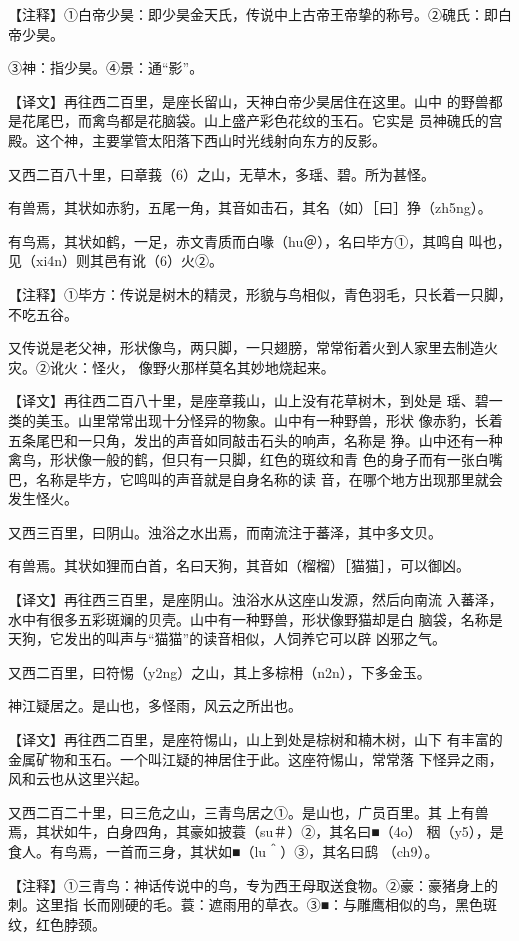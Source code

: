 \documentclass[a4paper,12pt,UTF8,twoside]{ctexbook}
\begin{document}
【注释】①白帝少昊：即少昊金天氏，传说中上古帝王帝挚的称号。②磈氏：即白帝少昊。

③神：指少昊。④景：通“影”。

【译文】再往西二百里，是座长留山，天神白帝少昊居住在这里。山中 的野兽都是花尾巴，而禽鸟都是花脑袋。山上盛产彩色花纹的玉石。它实是 员神磈氏的宫殿。这个神，主要掌管太阳落下西山时光线射向东方的反影。

又西二百八十里，曰章莪（6）之山，无草木，多瑶、碧。所为甚怪。

有兽焉，其状如赤豹，五尾一角，其音如击石，其名（如）［曰］狰（zh5ng）。

有鸟焉，其状如鹤，一足，赤文青质而白喙（hu＠），名曰毕方①，其鸣自 叫也，见（xi4n）则其邑有讹（6）火②。

【注释】①毕方：传说是树木的精灵，形貌与鸟相似，青色羽毛，只长着一只脚，不吃五谷。

又传说是老父神，形状像鸟，两只脚，一只翅膀，常常衔着火到人家里去制造火灾。②讹火：怪火， 像野火那样莫名其妙地烧起来。

【译文】再往西二百八十里，是座章莪山，山上没有花草树木，到处是 瑶、碧一类的美玉。山里常常出现十分怪异的物象。山中有一种野兽，形状 像赤豹，长着五条尾巴和一只角，发出的声音如同敲击石头的响声，名称是 狰。山中还有一种禽鸟，形状像一般的鹤，但只有一只脚，红色的斑纹和青 色的身子而有一张白嘴巴，名称是毕方，它鸣叫的声音就是自身名称的读 音，在哪个地方出现那里就会发生怪火。

又西三百里，曰阴山。浊浴之水出焉，而南流注于蕃泽，其中多文贝。

有兽焉。其状如狸而白首，名曰天狗，其音如（榴榴）［猫猫］，可以御凶。

【译文】再往西三百里，是座阴山。浊浴水从这座山发源，然后向南流 入蕃泽，水中有很多五彩斑斓的贝壳。山中有一种野兽，形状像野猫却是白 脑袋，名称是天狗，它发出的叫声与“猫猫”的读音相似，人饲养它可以辟 凶邪之气。

又西二百里，曰符惕（y2ng）之山，其上多棕枏（n2n），下多金玉。

神江疑居之。是山也，多怪雨，风云之所出也。

【译文】再往西二百里，是座符惕山，山上到处是棕树和楠木树，山下 有丰富的金属矿物和玉石。一个叫江疑的神居住于此。这座符惕山，常常落 下怪异之雨，风和云也从这里兴起。

又西二百二十里，曰三危之山，三青鸟居之①。是山也，广员百里。其 上有兽焉，其状如牛，白身四角，其豪如披蓑（su＃）②，其名曰■（4o） 秵（y5），是食人。有鸟焉，一首而三身，其状如■（lu＾）③，其名曰鸱 （ch9）。

【注释】①三青鸟：神话传说中的鸟，专为西王母取送食物。②豪：豪猪身上的刺。这里指 长而刚硬的毛。蓑：遮雨用的草衣。③■：与雕鹰相似的鸟，黑色斑纹，红色脖颈。
\end{document}
